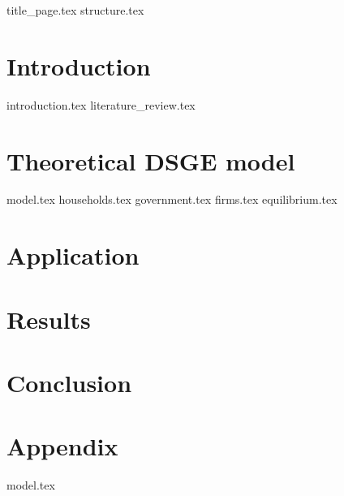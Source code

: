 \documentclass[12pt]{article}
\begin{document}
\begin{sloppypar}
{title_page.tex}
\pagebreak
{structure.tex}
\pagebreak
{}
\section{Introduction}
{introduction.tex}
{literature_review.tex}

\section{Theoretical DSGE model}
{model.tex}
{households.tex}
{government.tex}
{firms.tex}
{equilibrium.tex}
\section{Application} \label{application}
\section{Results}
\section{Conclusion}
\section{Appendix}
\appendix 
{model.tex}

\end{sloppypar}
\end{document}

